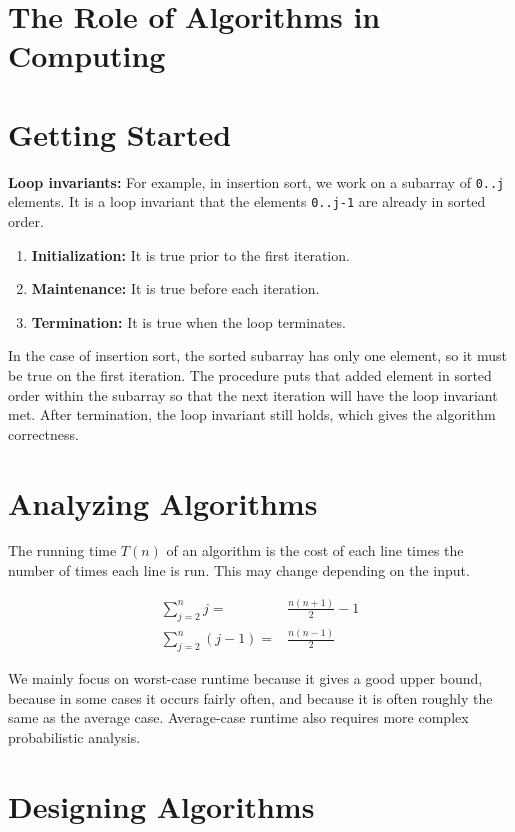 \documentclass[12pt]{article}
\begin{document}
\section{The Role of Algorithms in Computing}

\section{Getting Started}
\textbf{Loop invariants:} For example, in insertion sort, we work on a subarray of \texttt{0..j} elements. It is a loop invariant that the elements \texttt{0..j-1} are already in sorted order.
\begin{enumerate}
    \item \textbf{Initialization:} It is true prior to the first iteration.
    \item \textbf{Maintenance:} It is true before each iteration.
    \item \textbf{Termination:} It is true when the loop terminates.
\end{enumerate}
In the case of insertion sort, the sorted subarray has only one element, so it must be true on the first iteration. The procedure puts that added element in sorted order within the subarray so that the next iteration will have the loop invariant met. After termination, the loop invariant still holds, which gives the algorithm correctness.

\section{Analyzing Algorithms}
The running time $T(n)$ of an algorithm is the cost of each line times the number of times each line is run. This may change depending on the input.

\begin{align*}
    \sum_{j=2}^n j =& \frac{n(n+1)}{2} - 1 \\
    \sum_{j=2}^n (j-1) =& \frac{n(n-1)}{2}
\end{align*}

We mainly focus on worst-case runtime because it gives a good upper bound, because in some cases it occurs fairly often, and because it is often roughly the same as the average case. Average-case runtime also requires more complex probabilistic analysis.

\section{Designing Algorithms}
\end{document}
